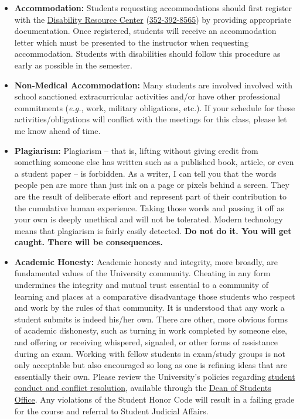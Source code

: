 \documentclass[11pt]{article}
\begin{document}
\begin{itemize}
	\item \textbf{Accommodation:} Students requesting accommodations should first register with the {\href{https://disability.ufl.edu}{Disability Resource Center}} ({\href{tel:3523928565}{352-392-8565}}) by providing appropriate documentation. Once registered, students will receive an accommodation letter which must be presented to the instructor when requesting accommodation. Students with disabilities should follow this procedure as early as possible in the semester.
	\item \textbf{Non-Medical Accommodation:} Many students are involved involved with school sanctioned extracurricular activities and/or have other professional commitments (\textit{e.g.}, work, military obligations, etc.). If your schedule for these activities/obligations will conflict with the meetings for this class, please let me know ahead of time.
	\item \textbf{Plagiarism:} Plagiarism -- that is, lifting without giving credit from something someone else has written such as a published book, article, or even a student paper -- is forbidden. As a writer, I can tell you that the words people pen are more than just ink on a page or pixels behind a screen. They are the result of deliberate effort and represent part of their contribution to the cumulative human experience. Taking those words and passing it off as your own is deeply unethical and will not be tolerated. Modern technology means that plagiarism is fairly easily detected. \textbf{Do not do it. You will get caught. There will be consequences.}
\item \textbf{Academic Honesty:} Academic honesty and integrity, more broadly, are fundamental values of the University community. Cheating in any form undermines the integrity and mutual trust essential to a community of learning and places at a comparative disadvantage those students who respect and work by the rules of that community. It is understood that any work a student submits is indeed his/her own. There are other, more obvious forms of academic dishonesty, such as turning in work completed by someone else, and offering or receiving whispered, signaled, or other forms of assistance during an exam. Working with fellow students in exam/study groups is not only acceptable but also encouraged so long as one is refining ideas that are essentially their own. Please review the University's policies regarding {\href{https://sccr.dso.ufl.edu}{student conduct and conflict resolution}}, available through the {\href{https://dso.ufl.edu}{Dean of Students Office}}. Any violations of the Student Honor Code will result in a failing grade for the course and referral to Student Judicial Affairs.

\end{itemize}
\end{document}

